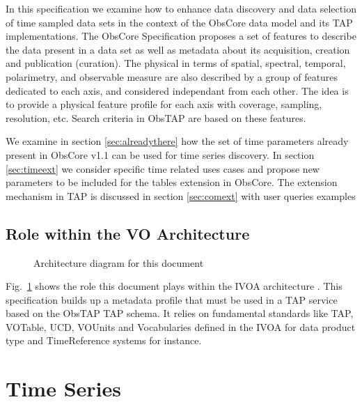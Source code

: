 \documentclass[11pt,a4paper]{ivoa}
\begin{document}
In this specification we examine how to enhance data discovery and data selection of time sampled data sets in the context of the ObsCore data model and its TAP implementations.
The ObsCore Specification \cite{2017ivoa.spec.0509L} proposes a set of features to describe the data present in a data set as well as metadata about its acquisition, creation and publication (curation).
The physical in terms of spatial, spectral, temporal, polarimetry, and observable measure  are also described by a group of features dedicated to each axis, and considered independant from each other. The idea is to provide a physical feature profile for each axis with coverage, sampling, resolution, etc.
Search criteria in ObsTAP  are based on these features.

We examine in section \ref{sec:alreadythere} how the set of time parameters already present in ObsCore v1.1 can be used for time series discovery.
In section \ref{sec:timeext} we consider specific time related uses cases and propose new parameters to be included for the tables extension in ObsCore.
The extension mechanism in TAP is discussed  in section \ref{sec:comext} with user queries examples

\subsection{Role within the VO Architecture}

\begin{figure}
\centering


\caption{Architecture diagram for this document}
\label{fig:archdiag}
\end{figure}

Fig.~\ref{fig:archdiag} shows the role this document plays within the
IVOA architecture \citep{2021ivoa.spec.1101D}. This specification builds up a metadata profile that must be used in a TAP service based on the ObsTAP TAP schema.
It relies on fundamental  standards like TAP, VOTable, UCD, VOUnits and Vocabularies defined in the IVOA  for data product type and TimeReference systems
for instance.


\section{Time Series}
\label{sect:metadata}
\end{document}
